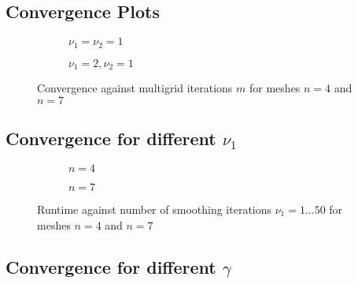 \documentclass[11pt,a4paper]{article}
\begin{document}
\subsection{Convergence Plots}

\begin{figure}[h!]
	\centering
	\begin{subfigure}[h!]{.49\textwidth}
		\begin{center}
			\resizebox{0.52\width}{!}{}
			\caption{$\nu_1 = \nu_2 = 1$}
			\label{fig::Res1}
		\end{center}	
	\end{subfigure}
	\hfill
	\begin{subfigure}[h!]{.49\textwidth}
		\centering
		\resizebox{0.52\width}{!}{}
		\caption{$\nu_1 = 2,  \nu_2 = 1$}
		\label{fig::Res2}
	\end{subfigure}
	\label{fig::Res}
	\caption{Convergence against multigrid iterations $m$ for meshes $n=4$ and $n=7$ }
\end{figure}

\subsection{Convergence for different $\nu_1$}

\begin{figure}[h!]
	\centering
	\begin{subfigure}[h!]{.49\textwidth}
		\begin{center}
			\resizebox{0.52\width}{!}{}
			\caption{$n=4$}
			\label{fig::TimNu1}
		\end{center}	
	\end{subfigure}
	\hfill
	\begin{subfigure}[h!]{.49\textwidth}
		\centering
		\resizebox{0.52\width}{!}{}
		\caption{$n=7$}
		\label{fig::TimNu2}
	\end{subfigure}
	\label{fig::TimNu}
	\caption{Runtime against number of smoothing iterations $\nu_1 = 1...50 $ for meshes $n=4$ and $n=7$ }
\end{figure}


\subsection{Convergence for different $\gamma$}
\end{document}
